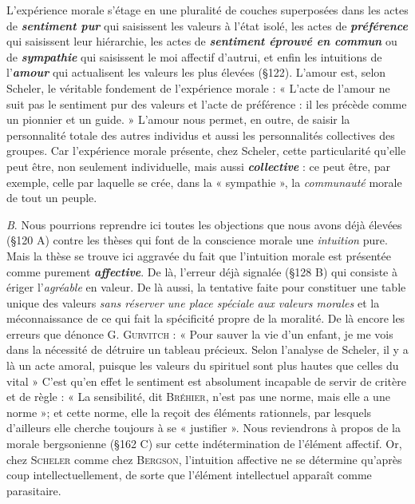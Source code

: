 L'expérience morale s’étage en une pluralité de couches superposées
dans les actes de \textbf{\textit {sentiment pur}} qui saisissent les valeurs à l’état
isolé, les actes de \textbf{\textit {préférence}} qui saisissent leur hiérarchie, les actes de
\textbf{\textit {sentiment éprouvé en commun}} ou de \textbf{\textit {sympathie}} qui saisissent le
moi affectif d'autrui, et enfin les intuitions de l’\textbf{\textit {amour}} qui actualisent
les valeurs les plus élevées (\S 122). L'amour est, selon Scheler, le véritable
fondement de l’expérience morale : « L'acte de l’amour ne suit
pas le sentiment pur des valeurs et l’acte de préférence : il les précède
comme un pionnier et un guide. » L’amour nous permet, en outre,
de saisir la personnalité totale des autres individus et aussi les personnalités
collectives des groupes. Car l’expérience morale présente, chez
Scheler, cette particularité qu’elle peut être, non seulement individuelle,
mais aussi \textbf{\textit {collective}} : ce peut être, par exemple, celle par
laquelle se crée, dans la « sympathie », la {\it communauté} morale de tout
un peuple.

{\it B}. Nous pourrions reprendre ici toutes les objections que nous
avons déjà élevées (\S 120 A) contre les thèses qui font de la conscience
morale une {\it intuition} pure. Mais la thèse se trouve ici aggravée du fait
que l'intuition morale est présentée comme purement \textbf{\textit {affective}}. De
là, l'erreur déjà signalée (\S 128 B) qui consiste à ériger l’{\it agréable} en
valeur. De là aussi, la tentative faite pour constituer une table unique
des valeurs {\it sans réserver une place spéciale aux valeurs morales} et la
méconnaissance de ce qui fait la spécificité propre de la moralité.
De là encore les erreurs que dénonce G. \textsc{Gurvitch} : « Pour sauver
la vie d’un enfant, je me vois dans la nécessité de détruire un tableau
précieux. Selon l’analyse de Scheler, il y a là un acte amoral, puisque
les valeurs du spirituel sont plus hautes que celles du vital » C'est
qu’en effet le sentiment est absolument incapable de servir de critère
et de règle : « La sensibilité, dit \textsc{Bréhier}, n’est pas une norme, mais
elle a une norme »; et cette norme, elle la reçoit des éléments rationnels,
par lesquels d’ailleurs elle cherche toujours à se « justifier ».
Nous reviendrons à propos de la morale bergsonienne (\S 162 C)
sur cette indétermination de l’élément affectif. Or, chez \textsc{Scheler}
comme chez \textsc{Bergson}, l’intuition affective ne se détermine qu'après
coup intellectuellement, de sorte que l’élément intellectuel apparaît
comme parasitaire.

